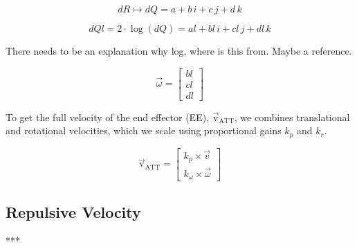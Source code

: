 \documentclass[]{article}
\begin{document}
\begin{equation}
	dR \mapsto dQ = a + b \, i + c \, j + d \, k
	\label{eq: quat_mapsto}
\end{equation}

\begin{equation}
	dQl = 2 \cdot \log(dQ) = al + bl \, i + cl \, j + dl \, k
	\label{eq:quat_log}
\end{equation}

\alert{There needs to be an explanation why log, where is this from. Maybe a reference.}



\begin{equation}
	\vec{\omega} =
	\begin{bmatrix}
		bl \\
		cl \\
		dl
	\end{bmatrix}
	\label{eq:rot_error_vector}
\end{equation}

To get the full velocity of the end effector (EE), \( \mathrm{\vec{v}_{ATT}} \), we combines translational and rotational velocities, which we scale using proportional gains \( k_p \) and \( k_r \).

\begin{equation}
	\mathrm{\vec{v}_{ATT}} = 
	\begin{bmatrix}
		k_p \times \vec{v}   \\
		k_{\omega} \times \vec{\omega}
	\end{bmatrix}
	\label{eq:ee_velocity}
\end{equation}

\subsection{Repulsive Velocity}


***
\end{document}
